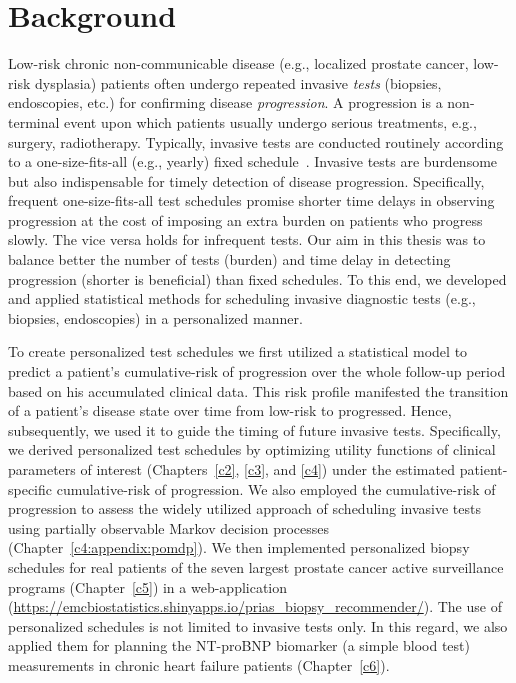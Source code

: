 \section{Background}
\label{c7:sec:background}
Low-risk chronic non-communicable disease (e.g., localized prostate cancer, low-risk dysplasia) patients often undergo repeated invasive \emph{tests} (biopsies, endoscopies, etc.) for confirming disease \emph{progression}. A progression is a non-terminal event upon which patients usually undergo serious treatments, e.g., surgery, radiotherapy. Typically, invasive tests are conducted routinely according to a one-size-fits-all (e.g., yearly) fixed schedule~\citep{bokhorst2015compliance,choi2012screening,krist2007timing,mcwilliams2008surveillance,henderson2011surveillance}. Invasive tests are burdensome~\citep{loeb2013systematic,krist2007timing} but also indispensable for timely detection of disease progression. Specifically, frequent one-size-fits-all test schedules promise shorter time delays in observing progression at the cost of imposing an extra burden on patients who progress slowly. The vice versa holds for infrequent tests. Our aim in this thesis was to balance better the number of tests (burden) and time delay in detecting progression (shorter is beneficial) than fixed schedules. To this end, we developed and applied statistical methods for scheduling invasive diagnostic tests (e.g., biopsies, endoscopies) in a personalized manner.

To create personalized test schedules we first utilized a statistical model to predict a patient's cumulative-risk of progression over the whole follow-up period based on his accumulated clinical data. This risk profile manifested the transition of a patient's disease state over time from low-risk to progressed. Hence, subsequently, we used it to guide the timing of future invasive tests. Specifically, we derived personalized test schedules by optimizing utility functions of clinical parameters of interest (Chapters~\ref{c2}, \ref{c3}, and \ref{c4}) under the estimated patient-specific cumulative-risk of progression. We also employed the cumulative-risk of progression to assess the widely utilized approach of scheduling invasive tests using partially observable Markov decision processes (Chapter~\ref{c4:appendix:pomdp}). We then implemented personalized biopsy schedules for real patients of the seven largest prostate cancer active surveillance programs (Chapter~\ref{c5}) in a web-application (\url{https://emcbiostatistics.shinyapps.io/prias_biopsy_recommender/}). The use of personalized schedules is not limited to invasive tests only. In this regard, we also applied them for planning the NT-proBNP biomarker (a simple blood test) measurements in chronic heart failure patients (Chapter~\ref{c6}).
